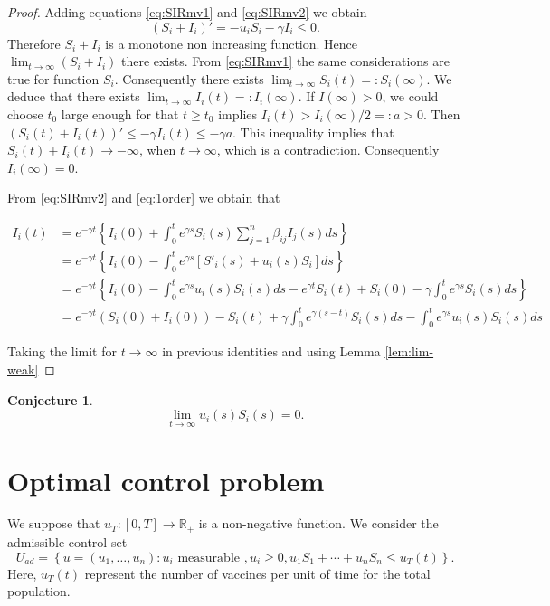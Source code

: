 \documentclass[a4paper,10pt]{article}
\newtheorem{conj}[thm]{Conjecture}
\theoremstyle{remark}
\begin{document}
\begin{proof} Adding equations \eqref{eq:SIRmv1} and \eqref{eq:SIRmv2} we obtain 
\[
 (S_i+I_i)'=- u_iS_i-\gamma I_i\leq 0.
\]
Therefore  $S_i+I_i$ is a monotone non increasing function. Hence $\lim_{t\to\infty} (S_i+I_i)$ there exists. From \eqref{eq:SIRmv1} the same considerations are true for function $S_i$. Consequently there exists $\lim_{t\to\infty} S_i(t)=:S_i(\infty)$. We deduce that there exists  $\lim_{t\to\infty} I_i(t)=:I_i(\infty)$. If $I(\infty)>0$, we could choose $t_0$ large enough for that $t\geq t_0$ implies $I_i(t)>I_i(\infty)/2=:a>0$. Then $(S_i(t)+I_i(t))'\leq -\gamma I_i(t)\leq -\gamma a$. This inequality implies that $S_i(t) +I_i(t)\to -\infty$, when $t\to\infty$, which is a contradiction. Consequently $I_i(\infty)=0$. 

 
From  \eqref{eq:SIRmv2} and \eqref{eq:1order} we obtain that


\[
\begin{split}
 I_i(t)&=e^{-\gamma t}
 \left\{
    I_i(0)+\int_0^t e^{\gamma s} S_{i}(s) \sum\limits_{j=1}^{n} \beta_{i j} I_{j}(s)ds
\right\}\\
&= e^{-\gamma t}
 \left\{
    I_i(0)-\int_0^t e^{\gamma s} \left[S'_i(s)+ u_i(s)S_i\right]ds 
  \right\}\\
  &= e^{-\gamma t}
 \left\{
    I_i(0)-\int_0^t e^{\gamma s}   u_i(s)S_i(s)ds
    -e^{\gamma t}S_i(t)+S_i(0)-\gamma\int_0^t e^{\gamma s} S_{i}(s) ds 
  \right\}\\
   &= e^{-\gamma t}\left(S_i(0)+ I_i(0)  \right)-S_i(t)
   +\gamma \int_0^t e^{\gamma (s-t)}S_{i}(s)ds-\int_0^t e^{\gamma s}   u_i(s)S_i(s)ds
 \end{split}
\]

Taking the limit for $t\to\infty$ in previous identities and using Lemma \ref{lem:lim-weak} 
\end{proof}


\begin{conj} 
 \[
 \lim\limits_{t\to\infty}  u_i(s)S_i(s)
=0.
\]

\end{conj}


\section{Optimal control problem}


We suppose that $ u_{T}:[0,T]\to\mathbb{R}_+$ is a non-negative function. We consider the admissible control set
\[U_{ad}=\left\{ u=\left( u_{1}, \ldots,  u_{n}\right):  u_{i}\right.\text{ measurable }, \left. u_{i} \geqslant 0,  u_{1}S_{1}+\cdots+ u_{n}S_{n}\leq u_{T}(t)\right\}.\]
Here, $ u_{T}(t)$ represent the number of vaccines per unit of time for the total population.
\end{document}
